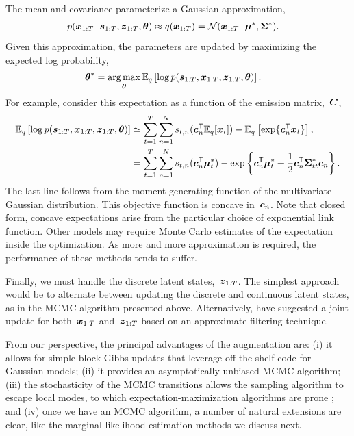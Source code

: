 The mean and covariance parameterize a Gaussian approximation,
\begin{align*}
  p(\boldsymbol{x}_{1:T} \,|\, \boldsymbol{s}_{1:T}, \boldsymbol{z}_{1:T}, \boldsymbol{\theta})
  &\approx
  q(\boldsymbol{x}_{1:T}) =
  \mathcal{N}(\boldsymbol{x}_{1:T} \,|\, \boldsymbol{\mu}^*, \boldsymbol{\Sigma}^*).
\end{align*}
Given this approximation, the parameters are updated by maximizing
the expected log probability,
\begin{align*}
  \btheta^*
  &=
  \argmax_{\btheta} \bbE_{q} \left[ \log p(\bs_{1:T}, \bx_{1:T}, \bz_{1:T}, \btheta) \right]. 
\end{align*}
For example, consider this expectation as a function of the emission
matrix,~$\boldsymbol{C}$,
\begin{align*}
  \mathbb{E}_q \left[ \log p(\boldsymbol{s}_{1:T}, \boldsymbol{x}_{1:T}, \boldsymbol{z}_{1:T}, \boldsymbol{\theta}) \right]
  &\simeq
  \sum_{t=1}^T \sum_{n=1}^N s_{t,n} (\boldsymbol{c}_{n}^{\mathsf{T}} \mathbb{E}_q[\boldsymbol{x}_{t}]) - \mathbb{E}_q\left[\exp\{\boldsymbol{c}_n^{\mathsf{T}} \boldsymbol{x}_{t}\} \right], \\
  &=
  \sum_{t=1}^T \sum_{n=1}^N s_{t,n} (\boldsymbol{c}_{n}^{\mathsf{T}} \boldsymbol{\mu}_{t}^*)
  - \exp \left\{
  \boldsymbol{c}_n^{\mathsf{T}} \boldsymbol{\mu}_t^*  +\frac{1}{2} \boldsymbol{c}_n^{\mathsf{T}} \boldsymbol{\Sigma}_{tt}^* \boldsymbol{c}_n
  \right\}.
\end{align*}
The last line follows from the moment generating function of the
multivariate Gaussian distribution.  This objective function is
concave in~$\boldsymbol{c}_n$. Note that closed form, concave expectations
arise from the particular choice of exponential link function.
Other models may require Monte Carlo estimates of the expectation
inside the optimization. As more and more approximation is required,
the performance of these methods tends to suffer.

Finally, we must handle the discrete latent states,~$\boldsymbol{z}_{1:T}$.
The simplest approach would be to alternate between updating the
discrete and continuous latent states, as in the
MCMC algorithm presented above. Alternatively, \citet{Petreska-2011}
have suggested a joint update for both~$\boldsymbol{x}_{1:T}$ and~$\boldsymbol{z}_{1:T}$
based on an approximate filtering technique. 

From our perspective, the principal advantages of the \polyagamma
augmentation are: (i) it allows for simple block Gibbs updates that
leverage off-the-shelf code for Gaussian models; (ii) it provides an
asymptotically unbiased MCMC algorithm;
(iii) the stochasticity of the MCMC transitions allows the sampling
algorithm to escape local modes, to which expectation-maximization
algorithms are prone \citep{bishop2006pattern}; and (iv) once we
have an MCMC algorithm, a number of natural extensions are clear,
like the marginal likelihood estimation methods we discuss next.


